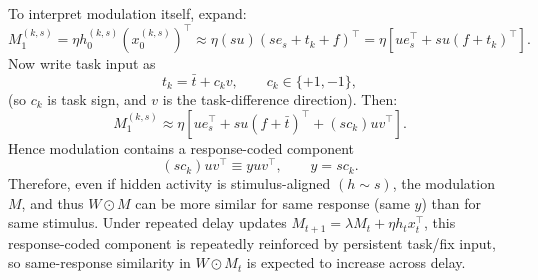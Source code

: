 \documentclass{article}
\begin{document}
To interpret modulation itself, expand:
\begin{equation}
    M_1^{(k,s)}=\eta h_0^{(k,s)}(x_0^{(k,s)})^\top
    \approx \eta (s u) (s e_s+t_k+f)^\top
    = \eta\!\left[u e_s^\top + s u(f+t_k)^\top\right].
\end{equation}
Now write task input as
\begin{equation}
    t_k=\bar t + c_k v,\qquad c_k\in\{+1,-1\},
\end{equation}
(so $c_k$ is task sign, and $v$ is the task-difference direction). Then:
\begin{equation}
    M_1^{(k,s)}
\approx \eta\!\left[u e_s^\top + s u(f+\bar t)^\top + (s c_k) u v^\top\right].
\end{equation}
Hence modulation contains a response-coded component
\begin{equation}
    (s c_k) u v^\top \equiv y u v^\top,\qquad y=s c_k.
\end{equation}
Therefore, even if hidden activity is stimulus-aligned $(h\sim s)$, the modulation $M$, and thus $W\odot M$ can be more similar for same response (same $y$) than for same stimulus.
Under repeated delay updates $M_{t+1}=\lambda M_t+\eta h_t x_t^\top$, this response-coded component is repeatedly reinforced by persistent task/fix input, so same-response similarity in $W\odot M_t$ is expected to increase across delay.
\end{document}
